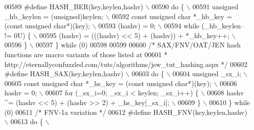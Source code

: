 \begin{DoxyCode}
{{{{{{{{00589 \textcolor{preprocessor}{#define HASH\_BER(key,keylen,hashv)                                               \(\backslash\)}
00590 \textcolor{preprocessor}{do \{                                                                             \(\backslash\)}
00591 \textcolor{preprocessor}{  unsigned \_hb\_keylen = (unsigned)keylen;                                        \(\backslash\)}
00592 \textcolor{preprocessor}{  const unsigned char *\_hb\_key = (const unsigned char*)(key);                    \(\backslash\)}
00593 \textcolor{preprocessor}{  (hashv) = 0;                                                                   \(\backslash\)}
00594 \textcolor{preprocessor}{  while (\_hb\_keylen-- != 0U) \{                                                   \(\backslash\)}
00595 \textcolor{preprocessor}{    (hashv) = (((hashv) << 5) + (hashv)) + *\_hb\_key++;                           \(\backslash\)}
00596 \textcolor{preprocessor}{  \}                                                                              \(\backslash\)}
00597 \textcolor{preprocessor}{\} while (0)}
00598 
00599 
00600 \textcolor{comment}{/* SAX/FNV/OAT/JEN hash functions are macro variants of those listed at}
00601 \textcolor{comment}{ * http://eternallyconfuzzled.com/tuts/algorithms/jsw\_tut\_hashing.aspx */}
00602 \textcolor{preprocessor}{#define HASH\_SAX(key,keylen,hashv)                                               \(\backslash\)}
00603 \textcolor{preprocessor}{do \{                                                                             \(\backslash\)}
00604 \textcolor{preprocessor}{  unsigned \_sx\_i;                                                                \(\backslash\)}
00605 \textcolor{preprocessor}{  const unsigned char *\_hs\_key = (const unsigned char*)(key);                    \(\backslash\)}
00606 \textcolor{preprocessor}{  hashv = 0;                                                                     \(\backslash\)}
00607 \textcolor{preprocessor}{  for (\_sx\_i=0; \_sx\_i < keylen; \_sx\_i++) \{                                       \(\backslash\)}
00608 \textcolor{preprocessor}{    hashv ^= (hashv << 5) + (hashv >> 2) + \_hs\_key[\_sx\_i];                       \(\backslash\)}
00609 \textcolor{preprocessor}{  \}                                                                              \(\backslash\)}
00610 \textcolor{preprocessor}{\} while (0)}
00611 \textcolor{comment}{/* FNV-1a variation */}
00612 \textcolor{preprocessor}{#define HASH\_FNV(key,keylen,hashv)                                               \(\backslash\)}
00613 \textcolor{preprocessor}{do \{                                                                             \(\backslash\)}
}}}}}}}}
\end{DoxyCode}
